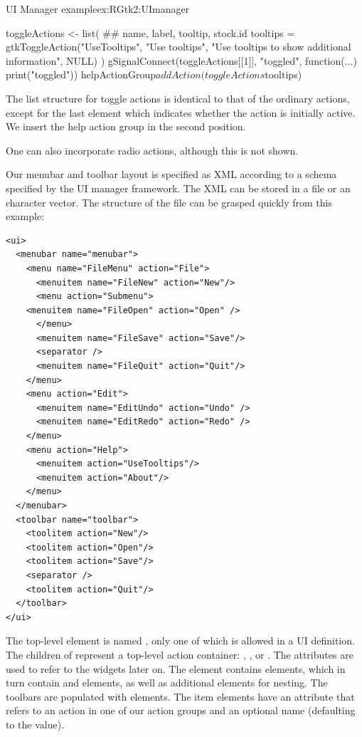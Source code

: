 \begin{example}{UI Manager example}{ex:RGtk2:UImanager}
\begin{Schunk}
\begin{Sinput}
 toggleActions <- list(
      ## name, label, tooltip, stock.id              
      tooltips = gtkToggleAction("UseTooltips", "Use tooltips", 
        "Use tooltips to show additional information", NULL)
 )
 gSignalConnect(toggleActions[[1]], "toggled", 
                function(...) print("toggled"))
 helpActionGroup$addAction(toggleActions$tooltips)
\end{Sinput}
\end{Schunk}
%
The list structure for toggle actions is identical to that of the
ordinary actions, except for the last element which indicates whether
the action is initially active.  We insert the help action group in
the second position.
\begin{Schunk}
\end{Schunk}
%
One can also incorporate radio actions, although this is not shown.

Our menubar and toolbar layout is specified as XML according to a
schema specified by the UI manager framework. The XML can be stored in
a file or an \R\/ character vector.  The structure of the file can be
grasped quickly from this example:
\begin{verbatim}
<ui>
  <menubar name="menubar">
    <menu name="FileMenu" action="File">
      <menuitem name="FileNew" action="New"/>
      <menu action="Submenu">
	<menuitem name="FileOpen" action="Open" />
      </menu>
      <menuitem name="FileSave" action="Save"/>
      <separator />
      <menuitem name="FileQuit" action="Quit"/>
    </menu>
    <menu action="Edit">
      <menuitem name="EditUndo" action="Undo" />
      <menuitem name="EditRedo" action="Redo" />
    </menu>
    <menu action="Help">
      <menuitem action="UseTooltips"/>
      <menuitem action="About"/>
    </menu>
  </menubar>
  <toolbar name="toolbar">
    <toolitem action="New"/>
    <toolitem action="Open"/>
    <toolitem action="Save"/>
    <separator />
    <toolitem action="Quit"/>
  </toolbar>
</ui>
\end{verbatim}

The top-level element is named , only one of which is allowed
in a UI definition. The children of  represent a top-level
action container: , , or .
The  attributes are used to refer to the widgets later
on. The  element contains  elements, which in
turn contain  and  elements, as well as
additional  elements for nesting. The toolbars are
populated with  elements. The item elements have an
 attribute that refers to an action in one of our action
groups and an optional name (defaulting to the 
value).


\end{example}
